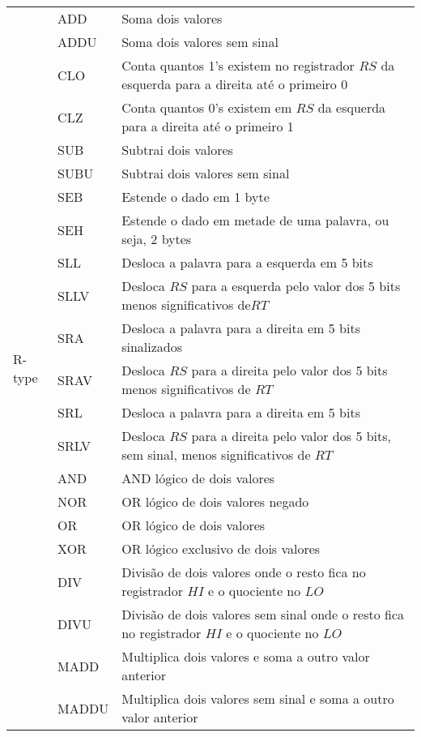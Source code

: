 \begin{center}
\begin{longtable}[pos]{|m{2cm} | m{1cm} | m{8cm}|}
			\multirow{30}{*}{R-type} & ADD & Soma dois valores \\ \cline{2-3}
			& ADDU & Soma dois valores sem sinal \\ \cline{2-3}
			& CLO & Conta quantos 1's existem no registrador $RS$ da esquerda para a direita até o primeiro 0 \\ \cline{2-3}
			& CLZ &  Conta quantos 0's existem em $RS$ da esquerda para a direita até o primeiro 1\\ \cline{2-3}
			& SUB & Subtrai dois valores  \\ \cline{2-3}
			& SUBU & Subtrai dois valores sem sinal \\ \cline{2-3}
			& SEB & Estende o dado em 1 byte \\ \cline{2-3}
			& SEH & Estende o dado em metade de uma palavra, ou seja,  2 bytes \\ \cline{2-3}
			& SLL & Desloca a palavra para a esquerda em 5 bits \\ \cline{2-3}
			& SLLV & Desloca $RS$ para a esquerda pelo valor dos 5 bits menos significativos de$RT$ \\ \cline{2-3}
			& SRA & Desloca a palavra para a direita em 5 bits sinalizados \\ \cline{2-3}
			& SRAV & Desloca $RS$ para a direita pelo valor dos 5 bits menos significativos de $RT$ \\ \cline{2-3}
			& SRL &  Desloca a palavra para a direita em 5 bits \\ \cline{2-3}
			& SRLV & Desloca $RS$ para a direita pelo valor dos 5 bits, sem sinal, menos significativos de $RT$  \\ \cline{2-3}
			& AND & AND lógico de dois valores \\ \cline{2-3}
			& NOR & OR lógico de dois valores negado \\ \cline{2-3}
			& OR &  OR lógico de dois valores\\ \cline{2-3}
			& XOR & OR lógico exclusivo de dois valores \\ \cline{2-3}
			& DIV &  Divisão de dois valores onde o resto fica no registrador $HI$ e o quociente no $LO$\\ \cline{2-3}
			& DIVU &  Divisão de dois valores sem sinal onde o resto fica no registrador $HI$ e o quociente no $LO$  \\ \cline{2-3}
			& MADD &  Multiplica dois valores e soma a outro valor anterior\\ \cline{2-3}
			& MADDU & Multiplica dois valores sem sinal e soma a outro valor anterior \\ \cline{2-3}

\end{longtable}
\end{center}
